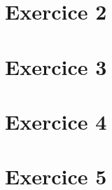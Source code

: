 \documentclass[12pt,a4paper]{article}
\begin{document}
\section{Exercice 2}

\vspace*{0.7cm}



\newpage

\section{Exercice 3}

\vspace*{0.7cm}



\newpage

\section{Exercice 4}

\vspace*{0.7cm}



\newpage

\section{Exercice 5}

\vspace*{0.7cm}


\end{document}
